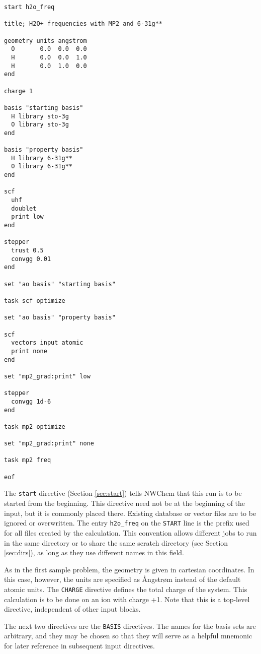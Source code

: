 \begin{verbatim}
start h2o_freq

title; H2O+ frequencies with MP2 and 6-31g**

geometry units angstrom
  O       0.0  0.0  0.0
  H       0.0  0.0  1.0
  H       0.0  1.0  0.0
end

charge 1

basis "starting basis"
  H library sto-3g
  O library sto-3g
end

basis "property basis"
  H library 6-31g**
  O library 6-31g**
end

scf
  uhf
  doublet
  print low
end

stepper
  trust 0.5
  convgg 0.01
end

set "ao basis" "starting basis"

task scf optimize

set "ao basis" "property basis"

scf
  vectors input atomic
  print none
end

set "mp2_grad:print" low

stepper
  convgg 1d-6
end

task mp2 optimize

set "mp2_grad:print" none

task mp2 freq

eof
\end{verbatim}

The {\tt start} directive (Section \ref{sec:start}) tells NWChem that
this run is to be started from the beginning.  This directive need not
be at the beginning of the input, but it is commonly placed there.
Existing database or vector files are to be ignored or overwritten.
The entry \verb+h2o_freq+ on the \verb+START+ line is the prefix used
for all files created by the calculation.  This convention allows
different jobs to run in the same directory or to share the same
scratch directory (see Section \ref{sec:dirs}), as long as they use
different names in this field.

As in the first sample problem, the geometry is given in cartesian
coordinates.  In this case, however, the units are specified as
{\AA}ngstr{\o}m instead of the default atomic units.  The {\tt CHARGE}
directive defines the total charge of the system.  This calculation is
to be done on an ion with charge +1.  Note that this is a top-level
directive, independent of other input blocks.

The next two directives are the {\tt BASIS} directives.  The names for
the basis sets are arbitrary, and they may be chosen so that they will
serve as a helpful mnemonic for later reference in subsequent input
directives.

